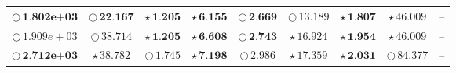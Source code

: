 \documentclass[
]{article}
\begin{document}
\begin{table}[!h]
\begin{tabular}[t]{ccccccccc}
\cellcolor[HTML]{2297E6}$\bigcirc\,\textbf{1.802e+03}$ & \cellcolor[HTML]{F5C710}$\bigcirc\,\textbf{22.167}$ & \cellcolor[HTML]{2297E6}$\star\,\textbf{1.205}$ & \cellcolor[HTML]{F5C710}$\star\,\textbf{6.155}$ & \cellcolor[HTML]{DF536B}$\bigcirc\,\textbf{2.669}$ & \cellcolor[HTML]{FFFFFF}$\bigcirc\,13.189$ & \cellcolor[HTML]{F5C710}$\star\,\textbf{1.807}$ & \cellcolor[HTML]{DF536B}$\star\,\textit{46.009}$ & --\\
\cellcolor[HTML]{FFFFFF}$\bigcirc\,1.909e+03$ & \cellcolor[HTML]{FFFFFF}$\bigcirc\,38.714$ & \cellcolor[HTML]{DF536B}$\star\,\textbf{1.205}$ & \cellcolor[HTML]{2297E6}$\star\,\textbf{6.608}$ & \cellcolor[HTML]{F5C710}$\bigcirc\,\textbf{2.743}$ & \cellcolor[HTML]{2297E6}$\star\,\textit{16.924}$ & \cellcolor[HTML]{2297E6}$\star\,\textbf{1.954}$ & \cellcolor[HTML]{2297E6}$\star\,\textit{46.009}$ & --\\
\cellcolor[HTML]{F5C710}$\bigcirc\,\textbf{2.712e+03}$ & \cellcolor[HTML]{F5C710}$\star\,\textit{38.782}$ & \cellcolor[HTML]{FFFFFF}$\bigcirc\,1.745$ & \cellcolor[HTML]{DF536B}$\star\,\textbf{7.198}$ & \cellcolor[HTML]{FFFFFF}$\bigcirc\,2.986$ & \cellcolor[HTML]{DF536B}$\star\,\textit{17.359}$ & \cellcolor[HTML]{DF536B}$\star\,\textbf{2.031}$ & \cellcolor[HTML]{FFFFFF}$\bigcirc\,84.377$ & --\\
\bottomrule
\end{tabular}
\end{table}
\end{document}
